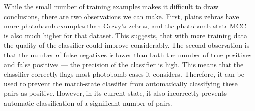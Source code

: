         While the small number of training examples makes it difficult to draw conclusions, there are two
          observations we can make.
        First, plains zebras have more photobomb examples than Grévy's zebras, and the photobomb-state MCC is
          also much higher for that dataset.
        This suggests, that with more training data the quality of the classifier could improve considerably.
        The second observation is that the number of false negatives is lower than both the number of true
          positives and false positives --- \ie{} the precision of the classifier is high.
        This means that the classifier correctly flags most photobomb cases it considers.
        Therefore, it can be used to prevent the match-state classifier from automatically classifying these
          pairs as positive.
        However, in its current state, it also incorrectly prevents automatic classification of a significant
          number of pairs.



        \ConfusionPhotobomb{}

        \EvalMetricsPhotobomb{}


    \FloatBarrier{}
